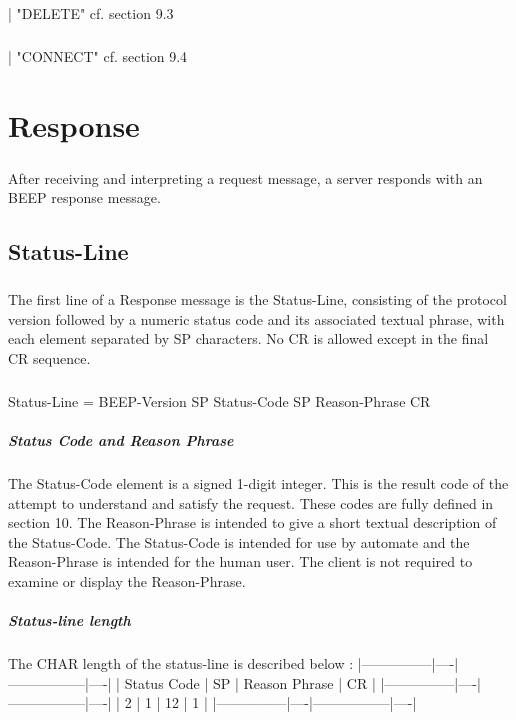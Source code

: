         \paragraph{}
                      | "DELETE"                 cf. section 9.3
        \paragraph{}
                      | "CONNECT"                cf. section 9.4


    \clearpage
\chapter{Response}
    \paragraph{}
   After receiving and interpreting a request message, a server responds
   with an BEEP response message.
    \section{Status-Line}
        \paragraph{}
   The first line of a Response message is the Status-Line, consisting
   of the protocol version followed by a numeric status code and its
   associated textual phrase, with each element separated by SP
   characters. No CR is allowed except in the final CR sequence.
        \paragraph{}
       Status-Line = BEEP-Version SP Status-Code SP Reason-Phrase CR
        \paragraph{Status Code and Reason Phrase}
   The Status-Code element is a signed 1-digit integer. This is the
   result code of the attempt to understand and satisfy the request.
   These codes are fully defined in section 10. The Reason-Phrase is
   intended to give a short textual description of the Status-Code. The
   Status-Code is intended for use by automate and the Reason-Phrase is
   intended for the human user. The client is not required to examine or
   display the Reason-Phrase.
        \paragraph{Status-line length}
   The CHAR length of the status-line is described below :
   |---------------|----|-----------------|----|
   | {Status Code} | SP | {Reason Phrase} | CR |
   |---------------|----|-----------------|----|
   |       2       |  1 |        12       |  1 |
   |---------------|----|-----------------|----|

